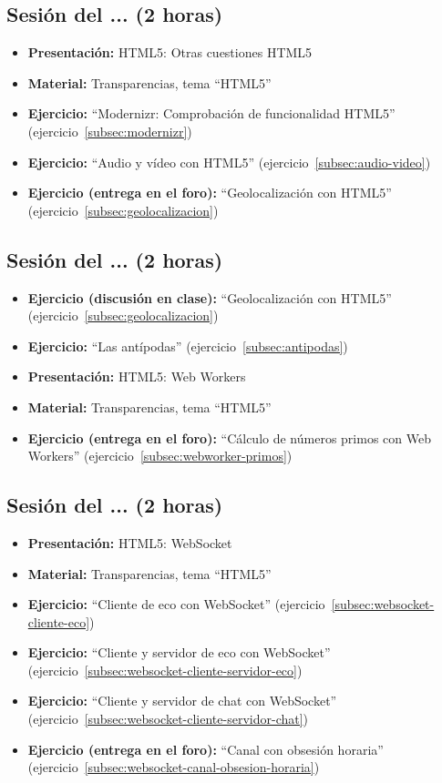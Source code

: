 \documentclass[a4paper,12pt]{report}
\begin{document}
\subsection{Sesión del ... (2 horas)}

\begin{itemize}
 \item \textbf{Presentación:} HTML5: Otras cuestiones HTML5
 \item \textbf{Material:} Transparencias, tema ``HTML5''
 \item \textbf{Ejercicio:} ``Modernizr: Comprobación de funcionalidad HTML5'' (ejercicio~\ref{subsec:modernizr})
 \item \textbf{Ejercicio:} ``Audio y vídeo con HTML5'' (ejercicio~\ref{subsec:audio-video})
 \item \textbf{Ejercicio (entrega en el foro):} ``Geolocalización con HTML5'' (ejercicio~\ref{subsec:geolocalizacion})
\end{itemize}


\subsection{Sesión del ... (2 horas)}

\begin{itemize}
 \item \textbf{Ejercicio (discusión en clase):} ``Geolocalización con HTML5'' (ejercicio~\ref{subsec:geolocalizacion})
 \item \textbf{Ejercicio:} ``Las antípodas'' (ejercicio~\ref{subsec:antipodas})
 \item \textbf{Presentación:} HTML5: Web Workers
 \item \textbf{Material:} Transparencias, tema ``HTML5''
 \item \textbf{Ejercicio (entrega en el foro):} ``Cálculo de números primos con Web Workers'' (ejercicio~\ref{subsec:webworker-primos})
\end{itemize}



\subsection{Sesión del ... (2 horas)}

\begin{itemize}
 \item \textbf{Presentación:} HTML5: WebSocket
 \item \textbf{Material:} Transparencias, tema ``HTML5''
 \item \textbf{Ejercicio:} ``Cliente de eco con WebSocket'' (ejercicio~\ref{subsec:websocket-cliente-eco})
 \item \textbf{Ejercicio:} ``Cliente y servidor de eco con WebSocket'' (ejercicio~\ref{subsec:websocket-cliente-servidor-eco})
 \item \textbf{Ejercicio:} ``Cliente y servidor de chat con WebSocket'' (ejercicio~\ref{subsec:websocket-cliente-servidor-chat})
 \item \textbf{Ejercicio (entrega en el foro):} ``Canal con obsesión horaria'' (ejercicio~\ref{subsec:websocket-canal-obsesion-horaria})
\end{itemize}
\end{document}
